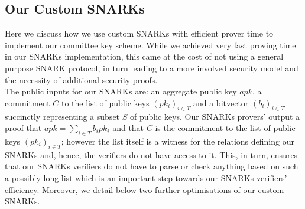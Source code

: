 \subsection{Our Custom SNARKs}

\noindent Here we discuss how we use custom SNARKs with efficient prover time to implement our committee key scheme. 
While we achieved very fast proving time in our SNARKs implementation, this came at the cost of not using a general purpose SNARK 
protocol, in turn leading to a more involved security model and the necessity of additional security proofs.  \\

\noindent The public inputs for our SNARKs are: an aggregate public key $\mathit{apk}$, a commitment $C$ to the list of 
public keys $(pk_i)_{i \in T}$ and a bitvector $(b_i)_{i \in T}$ succinctly representing a subset $S$ of public keys. 
Our SNARKs provers' output a proof that $apk=\sum_{i \in T} b_i pk_i$ and that $C$ is the commitment to the list of public keys 
$(pk_i)_{i \in T}$; however the list itself is a witness for the relations defining our SNARKs and, hence, the verifiers do not have access to it. 
This, in turn, ensures that our SNARKs verifiers do not have to parse or check anything based on such a possibly long list which is 
an important step towards our SNARKs verifiers' efficiency. Moreover, we detail below two further optimisations of our custom SNARKs.

